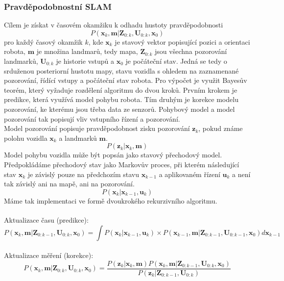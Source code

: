 \documentclass[12pt]{article}
\begin{document}
\subsubsection{Pravděpodobnostní SLAM}
Cílem je získat v časovém okamžiku k odhadu hustoty pravděpodobnosti
\begin{equation}
	P(\textbf{x}_k,\textbf{m}|\textbf{Z}_{0:k},\textbf{U}_{0:k},\textbf{x}_0)
\end{equation}
pro každý časový okamžik ${k}$, kde $\textbf{x}_k$ je stavový vektor popisující pozici a orientaci robota, $\textbf{m}$ je množina landmarů, tedy mapa, $\textbf{Z}_{0:k}$ jsou všechna pozorování landmarků, $\textbf{U}_{0:k}$ je historie vstupů a $\textbf{x}_0$ je počáteční stav. Jedná se tedy o srduženou posteriorní hustotu mapy, stavu vozidla s ohledem na zaznamenané pozorování, řídící vstupy a  počáteční stav robota. Pro výpočet je využit Bayesův teorém, který vyžaduje rozdělení algoritmu do dvou kroků. Prvním krokem je predikce, která využívá model pohybu robota. Tím druhým je korekce modelu pozorování, ke kterému jsou třeba data ze senzorů. Pohybový model a model pozorování tak popisují vliv vstupního řízení a pozorování.\\

\indent Model pozorování popisuje pravděpodobnost zisku pozorování $\textbf{z}_k$, pokud známe polohu vozidla $\textbf{x}_k$ a landmarků $\textbf{m}$.
\begin{equation}
	P(\textbf{z}_k|\textbf{x}_k,\textbf{m})
\end{equation} 
\indent Model pohybu vozidla může být popsán jako stavový přechodový model. \\Předpokládáme přechodový stav jako Markovův proces, při kterém následující stav $\textbf{x}_k$ je závislý pouze na předchozím stavu $\textbf{x}_{k-1}$ a aplikovaném řízení $\textbf{u}_k$ a není tak závislý ani na mapě, ani na pozorování.
\begin{equation}
	P(\textbf{x}_k|\textbf{x}_{k-1},\textbf{u}_k)
\end{equation}
Máme tak implementaci ve formě dvoukrokého rekurzivního algoritmu.\\
\\
Aktualizace času (predikce):
\begin{equation}
	P(\textbf{x}_k,\textbf{m}|\textbf{Z}_{0:k-1},\textbf{U}_{0:k},\textbf{x}_0)=\int P(\textbf{x}_k|\textbf{x}_{k-1},\textbf{u}_k)\times P(\textbf{x}_{k-1},\textbf{m}|\textbf{Z}_{0:k-1},\textbf{U}_{0:k-1},\textbf{x}_0)d\textbf{x}_{k-1}
\end{equation}
\\
Aktualizace měření (korekce):
\begin{equation}
	P(\textbf{x}_k,\textbf{m}|\textbf{Z}_{0:k},\textbf{U}_{0:k},\textbf{x}_0)=\frac{P(\textbf{z}_k|\textbf{x}_k,\textbf{m})P(\textbf{x}_k,\textbf{m}|\textbf{Z}_{0:k-1},\textbf{U}_{0:k},\textbf{x}_0)}{P(\textbf{z}_k|\textbf{Z}_{0:k-1},\textbf{U}_{0:k})}
\end{equation}
\end{document}
